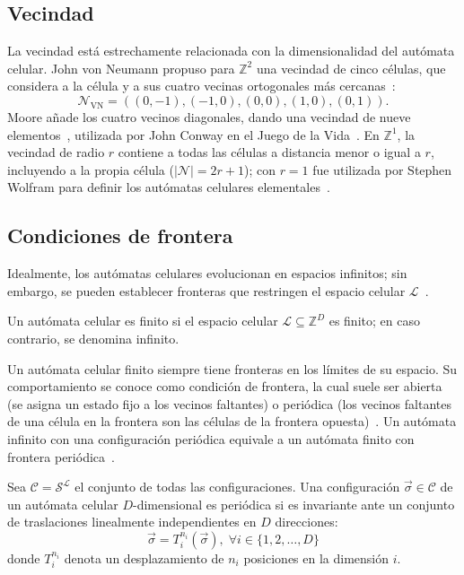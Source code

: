 \subsection{Vecindad}

La vecindad está estrechamente relacionada con la dimensionalidad del autómata celular. John von Neumann propuso para $\mathbb{Z}^2$ una vecindad de cinco células, que considera a la célula y a sus cuatro vecinas ortogonales más cercanas~\cite{neumann1966_ca}:
\[
\mathcal{N}_{\text{VN}} = ((0,-1), (-1,0), (0,0), (1,0), (0,1)).
\]
Moore añade los cuatro vecinos diagonales, dando una vecindad de nueve elementos~\cite{Kwon2015_moore}, utilizada por John Conway en el Juego de la Vida~\cite{lifewiki_life}. En $\mathbb{Z}^1$, la vecindad de radio $r$ contiene a todas las células a distancia menor o igual a $r$, incluyendo a la propia célula ($|\mathcal{N}| = 2r + 1$); con $r = 1$ fue utilizada por Stephen Wolfram para definir los autómatas celulares elementales~\cite{Wolfram2002_nks}.

\subsection{Condiciones de frontera}

Idealmente, los autómatas celulares evolucionan en espacios infinitos; sin embargo, se pueden establecer fronteras que restringen el espacio celular $\mathcal{L}$~\cite{bhattacharjee2019_ca,ponce2015_ca}.

\begin{definition}
Un autómata celular es finito si el espacio celular $\mathcal{L} \subseteq \mathbb{Z}^D$ es finito; en caso contrario, se denomina infinito.
\end{definition}

Un autómata celular finito siempre tiene fronteras en los límites de su espacio. Su comportamiento se conoce como condición de frontera, la cual suele ser abierta (se asigna un estado fijo a los vecinos faltantes) o periódica (los vecinos faltantes de una célula en la frontera son las células de la frontera opuesta)~\cite{ponce2015_ca}. Un autómata infinito con una configuración periódica equivale a un autómata finito con frontera periódica~\cite{bhattacharjee2019_ca}.

\begin{definition}
Sea $\mathcal{C} = \mathcal{S}^{\mathcal{L}}$ el conjunto de todas las configuraciones. Una configuración $\vec{\sigma} \in \mathcal{C}$ de un autómata celular $D$-dimensional es periódica si es invariante ante un conjunto de traslaciones linealmente independientes en $D$ direcciones:
\[
\vec{\sigma} = T_i^{n_i}(\vec{\sigma}), \; \forall i \in \{1, 2, \dots, D\}
\]
donde $T_i^{n_i}$ denota un desplazamiento de $n_i$ posiciones en la dimensión $i$.
\end{definition}

